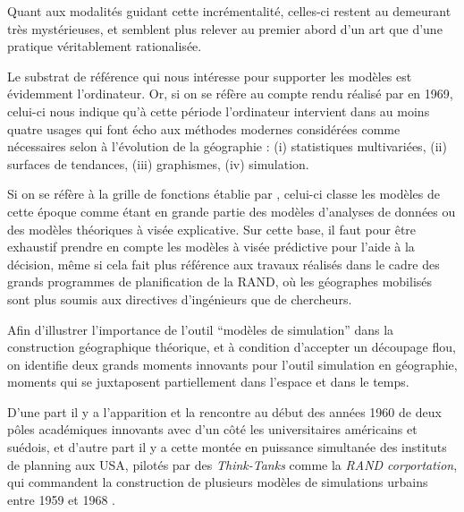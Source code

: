 Quant aux modalités guidant cette incrémentalité, celles-ci restent au demeurant très mystérieuses, et semblent plus relever au premier abord d'un art \autocites{Tocher1963, Axelrod1997} que d'une pratique véritablement rationalisée.

Le substrat de référence qui nous intéresse pour supporter les modèles est évidemment l'ordinateur. Or, si on se réfère au compte rendu réalisé par \textcite{Haggett1969} en 1969, celui-ci nous indique qu'à cette période l'ordinateur intervient dans au moins quatre usages qui font écho aux méthodes modernes considérées comme nécessaires selon \textcite{Claval1977} à l'évolution  de la géographie : (i) statistiques multivariées, (ii) surfaces de tendances, (iii) graphismes, (iv) simulation. 

Si on se réfère à la grille de fonctions établie par \textcite{Varenne2014}, celui-ci classe les modèles de cette époque comme étant en grande partie des modèles d'analyses de données ou des modèles théoriques à visée explicative. Sur cette base, il faut pour être exhaustif prendre en compte les modèles à visée prédictive pour l'aide à la décision, même si cela fait plus référence aux travaux réalisés dans le cadre des grands programmes de planification de la RAND, où les géographes mobilisés sont plus soumis aux directives d'ingénieurs que de chercheurs.


Afin d'illustrer l'importance de l'outil \enquote{modèles de simulation} dans la construction géographique théorique, et à condition d'accepter un découpage flou, on identifie deux grands moments innovants pour l'outil simulation en géographie, moments qui se juxtaposent partiellement dans l'espace et dans le temps.

D'une part il y a l'apparition et la rencontre au début des années 1960 de deux pôles académiques innovants avec d'un côté les universitaires américains et suédois, et d'autre part il y a cette montée en puissance simultanée des instituts de planning aux USA, pilotés par des \textit{Think-Tanks} comme la \textit{RAND corportation}, qui commandent la construction de plusieurs modèles de simulations urbains entre 1959 et 1968 \autocite[307]{Batty1976}. 

